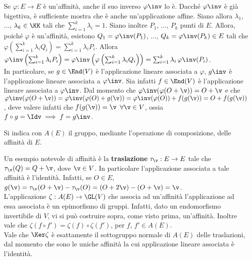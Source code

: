 \documentclass[11pt]{article}
\begin{document}
	\begin{remark}
		Se $\varphi : E \to E$ è un'affinità, anche il suo inverso $\varphi\inv$
		lo è. Dacché $\varphi\inv$ è già bigettiva, è sufficiente mostra
		che è anche un'applicazione affine. Siano allora $\lambda_1$, ...,
		$\lambda_k \in \KK$ tali che $\sum_{i=1}^k \lambda_i = 1$. Siano
		inoltre $P_1$, ..., $P_k$ punti di $E$. Allora, poiché $\varphi$
		è un'affinità, esistono $Q_1 = \varphi\inv(P_1)$, ..., $Q_k = \varphi\inv(P_k) \in E$ tali che
		$\varphi\left( \sum_{i=1}^k \lambda_i Q_i \right) = \sum_{i=1}^k \lambda_i P_i$. Allora $\varphi\inv\left( \sum_{i=1}^k \lambda_i P_i \right) = \varphi\inv\left(\varphi\left( \sum_{i=1}^k \lambda_i Q_i \right)\right) = \sum_{i=1}^k \lambda_i \, \varphi\inv(P_i)$. \\
		
		In particolare, se $g \in \End(V)$ è l'applicazione lineare associata
		a $\varphi$, $g\inv$ è l'applicazione lineare associata a $\varphi\inv$.
		Sia infatti $f \in \End(V)$ è l'applicazione lineare associata
		a $\varphi\inv$. Dal momento che $\varphi\inv(\varphi(O + \v)) = O + \v$
		e che $\varphi\inv(\varphi(O + \v)) = \varphi\inv(\varphi(O) + g(\v)) =
		\varphi\inv(\varphi(O)) + f(g(\v)) = O + f(g(\v))$, deve valere infatti
		che $f(g(\v)) = \v$ $\forall \v \in V$, ossia $f \circ g = \Idv \implies f = g\inv$.
	\end{remark}
	
	\begin{definition}  Si indica con $A(E)$ il gruppo,
		mediante l'operazione di composizione, delle affinità di $E$.
	\end{definition}
	
	\begin{remark}\nl
		\li Un esempio notevole di affinità è la \textbf{traslazione} $\tau_{\v} : E \to E$ tale che
		$\tau_{\v}(Q) = Q + \v$, dove $\v \in V$. In particolare l'applicazione associata a tale
		affinità è l'identità. Infatti, se $O \in E$, $g(\v) = \tau_{\v}(O + \v) - \tau_{\v}(O) = (O + 2\v) - (O + \v) = \v$. \\
		\li L'applicazione $\zeta : A(E) \to \GL(V)$ che associa ad un'affinità l'applicazione ad essa
		associata è un epimorfismo di gruppi. Infatti, dato un endomorfismo invertibile di $V$, vi
		si può costruire sopra, come visto prima, un'affinità. Inoltre vale che $\zeta(f \circ f') = \zeta(f) \circ \zeta(f')$, per $f$, $f' \in A(E)$. \\
		\li Vale che $\Ker \zeta$ è esattamente il sottogruppo normale di $A(E)$ delle traslazioni, dal momento
		che sono le uniche affinità la cui applicazione lineare associata è l'identità.
	\end{remark}
\end{document}
